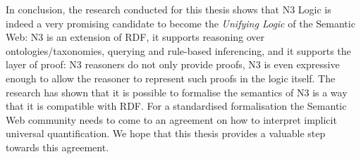 In conclusion, the research conducted for this thesis shows that N3 Logic is indeed a very promising candidate to become the \emph{Unifying Logic} of the Semantic Web:
N3 is an extension of RDF, it supports reasoning over ontologies/taxonomies, querying and rule-based inferencing, and it supports the layer
of proof: N3 reasoners do not only provide proofs, N3 is even expressive enough to allow the reasoner to represent such proofs in the logic itself. 
The research has shown that it is possible 
to formalise the semantics of N3 is a way that it is compatible with RDF. For a standardised formalisation the Semantic Web community needs to 
come to an agreement on how to interpret implicit universal quantification. We hope that this thesis provides a valuable step towards this agreement.
